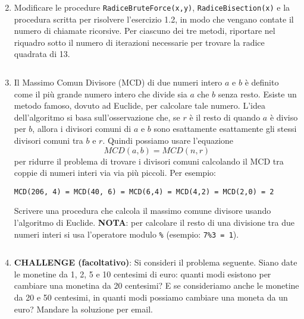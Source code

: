 \documentclass[11pt,a4]{article}
\newcommand{\mybox}[2]{$\quad$\fbox{
\begin{minipage}{#1cm}
\hfill\vspace{#2cm}
\end{minipage}
}}
\begin{document}
\begin{enumerate}
\mybox{15}{4.5}

\item Modificare le procedure {\tt RadiceBruteForce(x,y)}, {\tt RadiceBisection(x)} e la procedura
scritta per risolvere l'esercizio 1.2, in modo che vengano contate il numero di chiamate ricorsive.
Per ciascuno dei tre metodi, riportare nel riquadro sotto il numero di iterazioni necessarie
per trovare la radice quadrata di 13.

\mybox{15}{1.0}

\item Il Massimo Comun Divisore (MCD) di due numeri intero $a$ e $b$ è definito come 
il più grande numero intero che divide sia $a$ che $b$ senza resto. 
Esiste un metodo famoso, dovuto ad Euclide, per calcolare tale numero.
L'idea dell'algoritmo si basa sull'osservazione che, se $r$ è il resto di quando $a$ è diviso per $b$, 
allora i divisori comuni di $a$ e $b$ sono esattamente esattamente gli stessi divisori comuni tra $b$ e $r$. 
Quindi possiamo usare l'equazione $$MCD(a,b) = MCD(n,r)$$ per ridurre il problema di 
trovare i divisori comuni calcolando il MCD tra coppie di numeri interi via via più piccoli. Per esempio:

\begin{verbatim}
MCD(206, 4) = MCD(40, 6) = MCD(6,4) = MCD(4,2) = MCD(2,0) = 2
\end{verbatim}

Scrivere una procedura che calcola il massimo comune divisore usando l'algoritmo di Euclide.
{\bf NOTA}: per calcolare il resto di una divisione tra due numeri interi si usa l'operatore modulo {\tt \%}
(esempio: {\tt 7\%3 = 1}).

\mybox{15}{3.5}

\item {\bf CHALLENGE (facoltativo)}: Si consideri il problema seguente. Siano date le monetine
da 1, 2, 5 e 10 centesimi di euro: quanti modi esistono per cambiare una monetina da 20 centesimi?
E se consideriamo anche le monetine da 20 e 50 centesimi, 
in quanti modi possiamo cambiare una moneta da un euro? Mandare la soluzione per email.

\end{enumerate}
\end{document}
